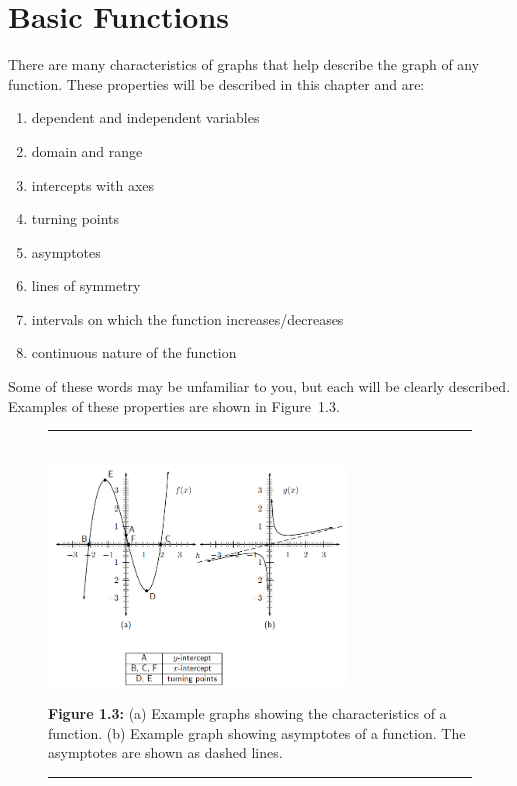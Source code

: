             \section{ Basic Functions}
            \nopagebreak
      \label{m39337*id235621}There are many characteristics of graphs that help describe the graph of any function. These properties will be described in this chapter and are:\par 
      \label{m39337*id235628}\begin{enumerate}[noitemsep, label=\textbf{\arabic*}. ] 
            \label{m39337*uid31}\item dependent and independent variables
\label{m39337*uid32}\item domain and range
\label{m39337*uid33}\item intercepts with axes
\label{m39337*uid34}\item turning points
\label{m39337*uid35}\item asymptotes
\label{m39337*uid36}\item lines of symmetry
\label{m39337*uid37}\item intervals on which the function increases/decreases
\label{m39337*uid38}\item continuous nature of the function
\end{enumerate}
      \label{m39337*id235730}Some of these words may be unfamiliar to you, but each will be clearly described. Examples of these properties are shown in Figure~1.3.\par 
    \setcounter{subfigure}{0}
	\begin{figure}[H] %
    \begin{center}
    \rule[.1in]{\figurerulewidth}{.005in} \\
        \label{m39337*uid39!!!underscore!!!media}\label{m39337*uid39!!!underscore!!!printimage}\includegraphics[width=300px]{col11306.imgs/m39337_MG10C11_034.png} %
      \vspace{2pt}
    \vspace{\rubberspace}\par \begin{cnxcaption}
	  \small \textbf{Figure 1.3: }(a) Example graphs showing the characteristics of a function. (b) Example graph showing asymptotes of a function. The asymptotes are shown as dashed lines.
	\end{cnxcaption}
    \vspace{.1in}
    \rule[.1in]{\figurerulewidth}{.005in} \\
    \end{center}
 \end{figure}       
      \label{m39337*uid40}
